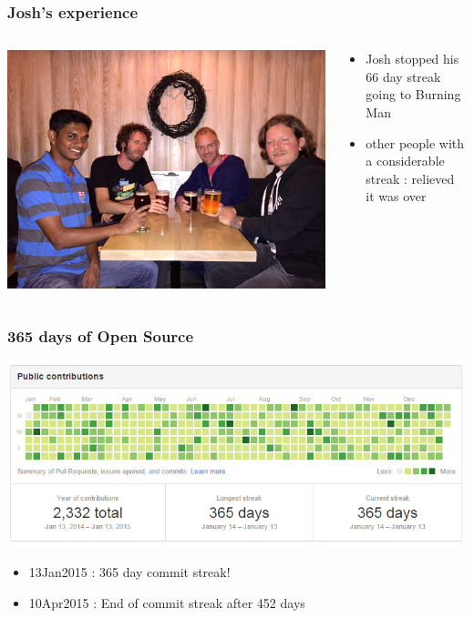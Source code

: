 \documentclass[14pt]{beamer}
\begin{document}
  \begin{frame}
    \frametitle{Josh's experience}
    \begin{columns}
      \begin{column}{0.5\textwidth}
        \includegraphics[scale=.05]{josh_justin.jpg}
      \end{column}
      \begin{column}{0.5\textwidth}
        \begin{itemize}
          \item Josh stopped his 66 day streak going to Burning Man
          \item other people with a considerable streak : relieved it was over
        \end{itemize}
      \end{column}
    \end{columns}
  \end{frame}
  \begin{frame}
    \frametitle{365 days of Open Source}
    \includegraphics[scale=.45]{github_oss365_13jan2015.png}
    \begin{itemize}
      \item 13Jan2015 : 365 day commit streak!
      \item 10Apr2015 : End of commit streak after 452 days
    \end{itemize}
  \end{frame}
\end{document}
